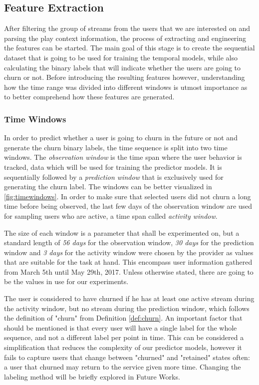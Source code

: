 \documentclass{kththesis}
\begin{document}
\subsection{Feature Extraction}

After filtering the group of streams from the users that we are interested on and parsing the play context information, the process of extracting and engineering the features can be started. The main goal of this stage is to create the sequential dataset that is going to be used for training the temporal models, while also calculating the binary labels that will indicate whether the users are going to churn or not. Before introducing the resulting features however, understanding how the time range was divided into different windows is utmost importance as to better comprehend how these features are generated.

\subsubsection{Time Windows}

In order to predict whether a user is going to churn in the future or not and generate the churn binary labels, the time sequence is split into two time windows. The \emph{observation window} is the time span where the user behavior is tracked, data which will be used for training the predictor models. It is sequentially followed by a \emph{prediction window} that is exclusively used for generating the churn label. The windows can be better visualized in \autoref{fig:timewindows}. In order to make sure that selected users did not churn a long time before being observed, the last few days of the observation window are used for sampling users who are active, a time span called \emph{activity window}. 

The size of each window is a parameter that shall be experimented on, but a standard length of \emph{56 days} for the observation window, \emph{30 days} for the prediction window and \emph{3 days} for the activity window were chosen by the provider as values that are suitable for the task at hand. This encompass user information gathered from March 5th until May 29th, 2017. Unless otherwise stated, there are going to be the values in use for our experiments.

The user is considered to have churned if he has at least one active stream during the activity window, but no stream during the prediction window, which follows the definition of "churn" from Definition \autoref{def:churn}. An important factor that should be mentioned is that every user will have a single label for the whole sequence, and not a different label per point in time. This can be considered a simplification that reduces the complexity of our predictor models, however it fails to capture users that change between "churned" and "retained" states often: a user that churned may return to the service given more time. Changing the labeling method will be briefly explored in Future Works. 
\end{document}
